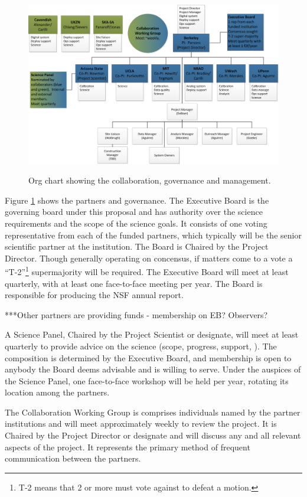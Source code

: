 \documentclass[preprint]{aastex}
\begin{document}
\begin{figure}[h]
\centering
\includegraphics[width=\textwidth]{plots/org.png}
\label{fig:org}
\caption{Org chart showing the collaboration, governance and management.}
\end{figure}

Figure \ref{fig:org} shows the partners and governance.  The Executive Board is the governing board under this proposal and has authority over the science requirements and the scope of the science goals. It consists of one voting representative from each of the funded partners, which typically will be the senior scientific partner at the institution.  The Board is Chaired by the Project Director.  Though generally operating on concensus, if matters come to a vote a ``T-2''\footnote{T-2 means that 2 or more must vote against to defeat a motion.} supermajority will be required.  The Executive Board will meet at least quarterly, with at least one face-to-face meeting per year.  The Board is responsible for producing the NSF annual report.

***Other partners are providing funds - membership on EB?  Observers?

A Science Panel, Chaired by the Project Scientist or designate, will meet at least quarterly to provide advice on the science (scope, progress, support, ).  The composition is determined by the Executive Board, and membership is open to anybody the Board deems advisable and is willing to serve.  Under the auspices of the Science Panel, one face-to-face workshop will be held per year, rotating its location among the partners.

The Collaboration Working Group is comprises individuals named by the partner institutions and will meet approximately weekly to review the project.  It is Chaired by the Project Director or designate and will discuss any and all relevant aspects of the project.  It represents the primary method of frequent communication between the partners.
\end{document}
